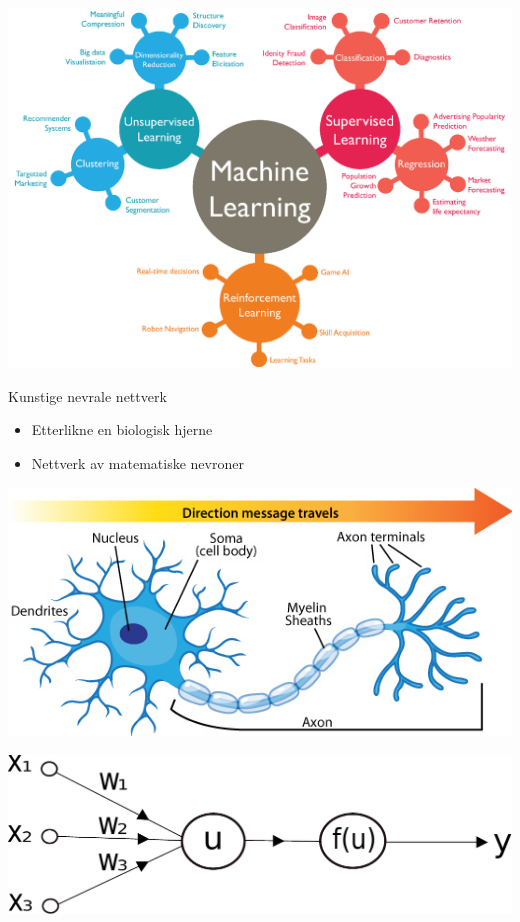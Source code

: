 \documentclass{beamer}
\begin{document}
\begin{frame}
 
\includegraphics[width=0.9\linewidth]{../Figures/Theory/MachineLearningDiagram.png}

\end{frame}


\begin{frame}

\begin{block}{Kunstige nevrale nettverk}
 \begin{itemize}
  \item Etterlikne en biologisk hjerne
  \item Nettverk av matematiske nevroner
 \end{itemize}
\end{block}


\end{frame}


\begin{frame}
 
\centering
\includegraphics[width=0.8\linewidth]{../Figures/Theory/neuron_anatomy.jpg} 

\includegraphics[width=0.8\linewidth]{../Figures/Theory/neuron.pdf} 

\end{frame}
\end{document}
